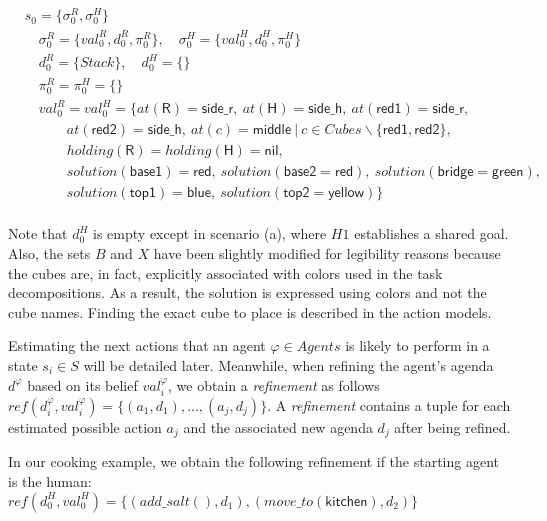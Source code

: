 {\small
\begin{align*}
&s_0 = \{\sigma^R_0, \sigma^H_0\} \\
&\quad \sigma^R_0 = \{ val^R_0, d^R_0, \pi^R_0 \}, \quad \sigma^H_0 = \{ val^H_0, d^H_0, \pi^H_0 \} \\
&\quad d^R_0 = \{ Stack \}, \quad d^H_0 = \{  \} \\
&\quad \pi^R_0 = \pi^H_0 = \{  \} \\
&\quad val^R_0 = val^H_0 = \{at(\textsf{R}) = \textsf{side\_r},~at(\textsf{H}) = \textsf{side\_h}, ~at(\textsf{red1}) = \textsf{side\_r}, \\
&\quad \quad \quad at(\textsf{red2}) = \textsf{side\_h}, ~at(c) = \textsf{middle} ~|~ c \in Cubes\backslash\{ \textsf{red1}, \textsf{red2} \}, \\
&\quad \quad \quad holding(\textsf{R}) = holding(\textsf{H}) = \textsf{nil}, \\
&\quad \quad \quad solution(\textsf{base1}) = \textsf{red}, ~solution(\textsf{base2} = \textsf{red}), ~solution(\textsf{bridge} = \textsf{green}),   \\
&\quad \quad \quad solution(\textsf{top1}) = \textsf{blue}, ~solution(\textsf{top2} = \textsf{yellow}) \}  \\
\end{align*}
}

Note that $d^H_0$ is empty except in scenario (a), where $H1$ establishes a shared goal. Also, the sets $B$ and $X$ have been slightly modified for legibility reasons because the cubes are, in fact, explicitly associated with colors used in the task decompositions. As a result, the solution is expressed using colors and not the cube names. Finding the exact cube to place is described in the action models.

Estimating the next actions that an agent $\varphi \in Agents$ is likely to perform in a state $s_i \in S$ will be detailed later. Meanwhile, when refining the agent's agenda $d^{\varphi}$ based on its belief $val^\varphi_i$, we obtain a \textit{refinement} as follows $\textit{ref}(d^\varphi_i, val^\varphi_i)= \{ (a_1,d_1),...,(a_j,d_j) \}$. 
A \textit{refinement} contains a tuple for each estimated possible action $a_j$ and the associated new agenda $d_j$ after being refined. 

In our cooking example, we obtain the following refinement if the starting agent is the human:\\
{\small
$\textit{ref}(d^H_0, val^H_0) = \{ (add\_salt(),d_1), (move\_to(\textsf{kitchen}),d_2) \}$
}


